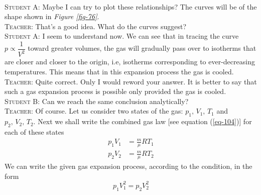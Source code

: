 \documentclass[a4paper,sfsidenotes]{tufte-book}
\begin{document}
\\
\textsc{Student A:} Maybe I can try to plot these relationships? The curves will be of the shape shown in \emph{Figure \ref{fig-76}}.
\\
\textsc{Teacher:} That's a good idea. What do the curves suggest?
\\
\textsc{Student A:} I seem to understand now. We can see that in tracing the curve $p \propto \dfrac{1}{V^{2}}$ toward greater volumes, the gas will gradually pass over to isotherms that are closer and closer to the origin, i.e, isotherms corresponding to ever-decreasing temperatures. This means that in this expansion process the gas is cooled.
\\
\textsc{Teacher:} Quite correct. Only I would reword your answer. It is better to say that such a gas expansion process is possible only provided the gas is cooled.
\\
\textsc{Student B:} Can we reach the same conclusion analytically?
\\
\textsc{Teacher:} Of course. Let us consider two states of the gas: $p_{1}, \,V_{1}, \,T_{1}$ and $p_{2},\, V_{2},\, T_{2}$. Next we shall write the combined gas law [see equation (\ref{eq-104})] for each of these states
\begin{align*}%
p_{1} V_{1} & = \frac{m}{\mu} RT_{1}\\
p_{2}V_{2} & = \frac{m}{\mu} RT_{2}
\end{align*}
We can write the given gas expansion process, according to the condition, in the form
\begin{equation*}%
p_{1} V_{1}^{2} = p_{2}V_{2}^{2}
\end{equation*}
\end{document}
